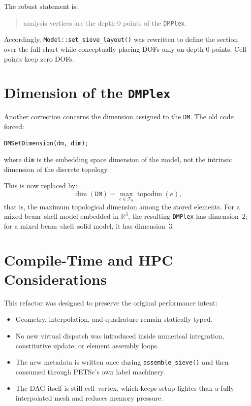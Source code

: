 The robust statement is:
\begin{quote}
analysis vertices are the depth-$0$ points of the \texttt{DMPlex}.
\end{quote}

Accordingly, \texttt{Model::set\_sieve\_layout()} was rewritten to define the
section over the full chart while conceptually placing DOFs only on depth-$0$
points. Cell points keep zero DOFs.

\section{Dimension of the \texttt{DMPlex}}

Another correction concerns the dimension assigned to the \texttt{DM}. The old
code forced:
\begin{verbatim}
DMSetDimension(dm, dim);
\end{verbatim}
where \texttt{dim} is the embedding space dimension of the model, not the
intrinsic dimension of the discrete topology.

This is now replaced by:
\begin{equation}
\dim(\texttt{DM}) = \max_{e \in \mathcal{T}_h} \operatorname{topodim}(e),
\end{equation}
that is, the maximum topological dimension among the stored elements. For a
mixed beam--shell model embedded in $\mathbb{R}^3$, the resulting
\texttt{DMPlex} has dimension~$2$; for a mixed beam--shell--solid model, it has
dimension~$3$.

\section{Compile-Time and HPC Considerations}

This refactor was designed to preserve the original performance intent:
\begin{itemize}
  \item Geometry, interpolation, and quadrature remain statically typed.
  \item No new virtual dispatch was introduced inside numerical integration,
        constitutive update, or element assembly loops.
  \item The new metadata is written once during \texttt{assemble\_sieve()} and
        then consumed through PETSc's own label machinery.
  \item The DAG itself is still cell--vertex, which keeps setup lighter than a
        fully interpolated mesh and reduces memory pressure.
\end{itemize}

